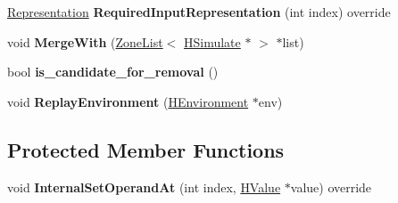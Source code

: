 \begin{DoxyCompactItemize}
\item 
\hyperlink{classv8_1_1internal_1_1_representation}{Representation} {\bfseries Required\+Input\+Representation} (int index) override\hypertarget{classv8_1_1internal_1_1_h_simulate_a4f8a62ce2df3f954a5c33c86fdb78617}{}\label{classv8_1_1internal_1_1_h_simulate_a4f8a62ce2df3f954a5c33c86fdb78617}

\item 
void {\bfseries Merge\+With} (\hyperlink{classv8_1_1internal_1_1_zone_list}{Zone\+List}$<$ \hyperlink{classv8_1_1internal_1_1_h_simulate}{H\+Simulate} $\ast$ $>$ $\ast$list)\hypertarget{classv8_1_1internal_1_1_h_simulate_a2b5d8b27b8110906d689c6faa83826d3}{}\label{classv8_1_1internal_1_1_h_simulate_a2b5d8b27b8110906d689c6faa83826d3}

\item 
bool {\bfseries is\+\_\+candidate\+\_\+for\+\_\+removal} ()\hypertarget{classv8_1_1internal_1_1_h_simulate_ae991ad8bec4259951d0bab71d9ec3ca3}{}\label{classv8_1_1internal_1_1_h_simulate_ae991ad8bec4259951d0bab71d9ec3ca3}

\item 
void {\bfseries Replay\+Environment} (\hyperlink{classv8_1_1internal_1_1_h_environment}{H\+Environment} $\ast$env)\hypertarget{classv8_1_1internal_1_1_h_simulate_aeafe5825f02b534e2d4da9b3dd2d230f}{}\label{classv8_1_1internal_1_1_h_simulate_aeafe5825f02b534e2d4da9b3dd2d230f}

\end{DoxyCompactItemize}
\subsection*{Protected Member Functions}
\begin{DoxyCompactItemize}
\item 
void {\bfseries Internal\+Set\+Operand\+At} (int index, \hyperlink{classv8_1_1internal_1_1_h_value}{H\+Value} $\ast$value) override\hypertarget{classv8_1_1internal_1_1_h_simulate_a73604f7d2464c46f28b2a5d90e8f3b77}{}\label{classv8_1_1internal_1_1_h_simulate_a73604f7d2464c46f28b2a5d90e8f3b77}

\end{DoxyCompactItemize}
